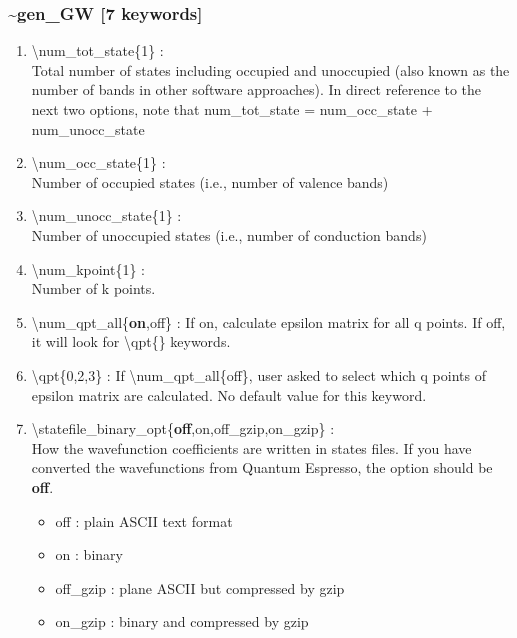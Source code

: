 \documentclass[letterpaper,12pt]{article}
\newcommand{\red}{\color{red}}
\newcommand{\black}{\color{black}}
\begin{document}
\subsubsection*{\bf \~{}gen\_GW [7 keywords]}
\begin{enumerate}


 \vspace{0.15in}
 \item   \textbackslash{}num\_tot\_state\{1\} : \\   
  Total number of states including occupied and unoccupied (also known as the number of bands in other software approaches). In direct reference to the next two options, note that num\_tot\_state = num\_occ\_state + num\_unocc\_state

 \vspace{0.15in}
 \item   \textbackslash{}num\_occ\_state\{1\} : \\   
  Number of occupied states (i.e., number of valence bands)

 \vspace{0.15in}
 \item   \textbackslash{}num\_unocc\_state\{1\} : \\   
  Number of unoccupied states (i.e., number of conduction bands)

 \vspace{0.15in}
 \item   \textbackslash{}num\_kpoint\{1\} : \\   
  Number of k points.

 
 \vspace{0.15in}
 \item   \textbackslash{}num\_qpt\_all\{{\bf on},off\} : If on, calculate epsilon matrix for all q points. If off, it will look for \textbackslash{}qpt\{\} keywords.


\vspace{0.15in}
\item \textbackslash{}qpt\{0,2,3\} : If \textbackslash{}num\_qpt\_all\{off\}, user asked to select which q points of epsilon matrix are calculated. No default value for this keyword.


 \vspace{0.15in}
 \item   \textbackslash{}statefile\_binary\_opt\{{\bf off},on,off\_gzip,on\_gzip\} : \\ 
 How the wavefunction coefficients are written in states files. If you have converted the wavefunctions from Quantum Espresso, the option should be {\bf off}. \\
 \black
 \begin{itemize}
   \item off : plain ASCII text format
   \item on : binary
   \item off\_gzip : plane ASCII but compressed by gzip
   \item on\_gzip : binary and compressed by gzip
 \end{itemize}




\end{enumerate}
\end{document}
